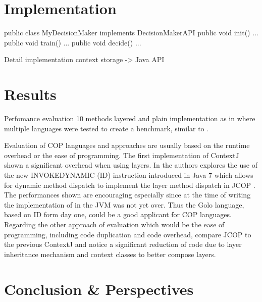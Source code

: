 \documentclass[a4paper]{article}
\begin{document}
\section{Implementation}
\label{section:implementation}
public class MyDecisionMaker implements DecisionMakerAPI {
  public void init() { ... }
  public void train() { ... }
  public void decide() { ... }
}

Detail implementation
context storage -> Java API

\section{Results}
\label{section:results}

Perfomance evaluation
10 methods layered and plain implementation as in \cite{appeltauer_comparison_2009} where multiple languages were tested to create a benchmark, similar to \cite{kamina_eventcj:_2011}.

Evaluation of COP languages and approaches are usually based on the runtime overhead or the ease of programming. The first implementation of ContextJ \cite{haupt_contextj:_2011} shown a significant overhead when using layers. In \cite{appeltauer_layered_2010} the authors explores the use of the new INVOKEDYNAMIC (ID) instruction introduced in Java 7 which allows for dynamic method dispatch to implement the layer method dispatch in JCOP \cite{appeltauer_declarative_2013}. The performances shown are encouraging especially since at the time of writing the implementation of in the JVM was not yet over. Thus the Golo language, based on ID form day one, could be a good applicant for COP languages. Regarding the other approach of evaluation which would be the ease of programming, including code duplication and code overhead, \cite{appeltauer_declarative_2013} compare JCOP to the previous ContextJ and notice a significant reduction of code due to layer inheritance mechanism and context classes to better compose layers.

\section{Conclusion \& Perspectives}
\label{section:conclusion}


%
%



\end{document}
